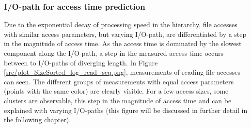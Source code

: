 \documentclass{superfri}
\begin{document}
\subsubsection{I/O-path for access time prediction}
\label{sec:path_for_pred}
Due to the exponential decay of processing speed in the hierarchy, file accesses with similar access parameters, but varying I/O-path, are differentiated by a step in the magnitude of access time.
As the access time is dominated by the slowest component along the I/O-path, a step in the measured access time occurs between to I/O-paths of diverging length.
In Figure\,\ref{src/plot_SizeSorted_log_read_seq.png}, measurements of reading file accesses can seen.
The different groups of measurements with equal access parameters (points with the same color) are clearly visible.
For a few access sizes, some clusters are observable, this step in the magnitude of access time and can be explained with varying I/O-paths (this figure will be discussed in further detail in the following chapter).
\end{document}
